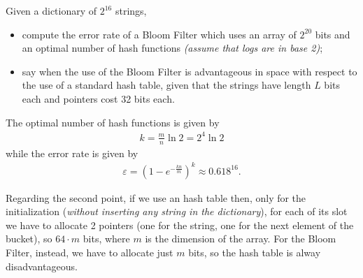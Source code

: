 \exercise

Given a dictionary of $2^{16}$ strings,
%
\begin{itemize}

  \item compute the error rate of a Bloom Filter which uses an array of $2^{20}$
  bits and an optimal number of hash functions \emph{(assume that logs are in
  base 2)};

  \item say when the use of the Bloom Filter is advantageous in space with
  respect to the use of a standard hash table, given that the strings have
  length $L$ bits each and pointers cost 32 bits each.

\end{itemize}

\solution

The optimal number of hash functions is given by
%
\begin{align*}
  k = \frac{m}{n}\ln 2 = 2^4 \ln 2
\end{align*}
%
while the error rate is given by
%
\begin{align*}
  \varepsilon = \left( 1 - e^{-\frac{kn}{m}}\right)^k \approx 0.618^{16}.
\end{align*}

Regarding the second point, if we use an hash table then, only for the
initialization (\emph{without inserting any string in the dictionary}), for each
of its slot we have to allocate 2 pointers (one for the string, one for the next
element of the bucket), so $64 \cdot m$ bits, where $m$ is the dimension of the
array. For the Bloom Filter, instead, we have to allocate just $m$ bits, so
the hash table is alway disadvantageous.
